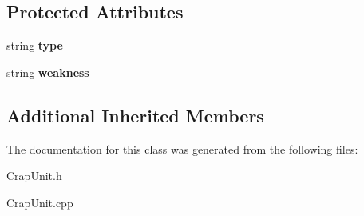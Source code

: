 \subsection*{Protected Attributes}
\begin{DoxyCompactItemize}
\item 
\hypertarget{class_crap_unit_a6b75381e9d70b4b5ac33d8c1d66b925d}{}string {\bfseries type}\label{class_crap_unit_a6b75381e9d70b4b5ac33d8c1d66b925d}

\item 
\hypertarget{class_crap_unit_ab98d883fdebd069691caebc847b0a65d}{}string {\bfseries weakness}\label{class_crap_unit_ab98d883fdebd069691caebc847b0a65d}

\end{DoxyCompactItemize}
\subsection*{Additional Inherited Members}


The documentation for this class was generated from the following files\+:\begin{DoxyCompactItemize}
\item 
Crap\+Unit.\+h\item 
Crap\+Unit.\+cpp\end{DoxyCompactItemize}
